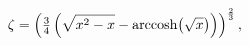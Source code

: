 \[\zeta=\left(\tfrac{3}{4}\left(\sqrt{x^{2}-x}-\mathop{\mathrm{arccosh}\/}%
\nolimits\!\left(\sqrt{x}\right)\right)\right)^{\frac{2}{3}},\]